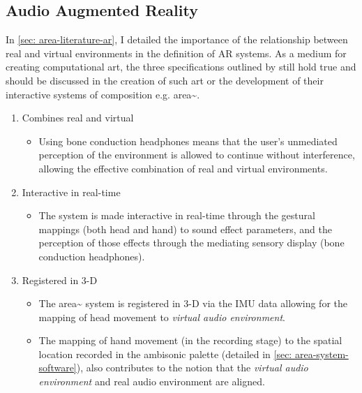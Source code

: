 \subsection{Audio Augmented Reality}            \label{sec: area-discussion-aar}
In \autoref{sec: area-literature-ar}, I detailed the importance of the relationship between real and virtual environments in the definition of AR systems. As a medium for creating computational art, the three specifications outlined by \citep{azuma1997} still hold true and should be discussed in the creation of such art or the development of their interactive systems of composition e.g. area\textasciitilde{}.
\begin{enumerate}
    \item Combines real and virtual
        \begin{itemize}
            \item Using bone conduction headphones means that the user’s unmediated perception of the environment is allowed to continue without interference, allowing the effective combination of real and virtual environments.
        \end{itemize}
    \item Interactive in real-time
        \begin{itemize}
            \item The system is made interactive in real-time through the gestural mappings (both head and hand) to sound effect parameters, and the perception of those effects through the mediating sensory display (bone conduction headphones).
        \end{itemize}
    \item Registered in 3-D
        \begin{itemize}
            \item The area\textasciitilde{} system is registered in 3-D via the IMU data allowing for the mapping of head movement to \textit{virtual audio environment}. 
            \item The mapping of hand movement (in the recording stage) to the spatial location recorded in the ambisonic palette (detailed in \autoref{sec: area-system-software}), also contributes to the notion that the \textit{virtual audio environment} and real audio environment are aligned.
        \end{itemize}
\end{enumerate}


